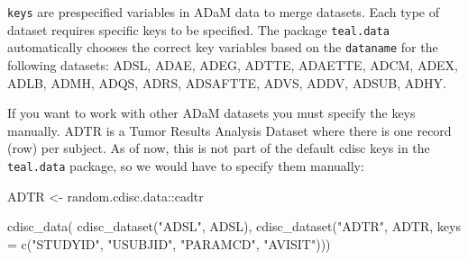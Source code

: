 \documentclass[
  letterpaper,
  DIV=11,
  numbers=noendperiod]{scrreprt}
\newenvironment{Shaded}{\begin{snugshade}}{\end{snugshade}}
\newcommand{\AttributeTok}[1]{\textcolor[rgb]{0.40,0.45,0.13}{#1}}
\newcommand{\FunctionTok}[1]{\textcolor[rgb]{0.28,0.35,0.67}{#1}}
\newcommand{\NormalTok}[1]{\textcolor[rgb]{0.00,0.23,0.31}{#1}}
\newcommand{\OtherTok}[1]{\textcolor[rgb]{0.00,0.23,0.31}{#1}}
\newcommand{\SpecialCharTok}[1]{\textcolor[rgb]{0.37,0.37,0.37}{#1}}
\newcommand{\StringTok}[1]{\textcolor[rgb]{0.13,0.47,0.30}{#1}}
\begin{document}
\begin{tcolorbox}[enhanced jigsaw, leftrule=.75mm, arc=.35mm, colback=white, colframe=quarto-callout-note-color-frame, opacityback=0, toprule=.15mm, bottomrule=.15mm, rightrule=.15mm, left=2mm, breakable]
\begin{minipage}[t]{5.5mm}
\textcolor{quarto-callout-note-color}{\faInfo}
\end{minipage}%
\begin{minipage}[t]{\textwidth - 5.5mm}
\texttt{keys} are prespecified variables in ADaM data to merge datasets.
Each type of dataset requires specific keys to be specified. The package
\texttt{teal.data} automatically chooses the correct key variables based
on the \texttt{dataname} for the following datasets: ADSL, ADAE, ADEG,
ADTTE, ADAETTE, ADCM, ADEX, ADLB, ADMH, ADQS, ADRS, ADSAFTTE, ADVS,
ADDV, ADSUB, ADHY.

If you want to work with other ADaM datasets you must specify the keys
manually. ADTR is a Tumor Results Analysis Dataset where there is one
record (row) per subject. As of now, this is not part of the default
cdisc keys in the \texttt{teal.data} package, so we would have to
specify them manually:

\begin{Shaded}
\begin{Highlighting}[]
\NormalTok{ADTR }\OtherTok{\textless{}{-}}\NormalTok{ random.cdisc.data}\SpecialCharTok{::}\NormalTok{cadtr}


\FunctionTok{cdisc\_data}\NormalTok{(}
  \FunctionTok{cdisc\_dataset}\NormalTok{(}\StringTok{"ADSL"}\NormalTok{, ADSL),}
  \FunctionTok{cdisc\_dataset}\NormalTok{(}\StringTok{"ADTR"}\NormalTok{, ADTR, }\AttributeTok{keys =} \FunctionTok{c}\NormalTok{(}\StringTok{"STUDYID"}\NormalTok{, }\StringTok{"USUBJID"}\NormalTok{, }\StringTok{"PARAMCD"}\NormalTok{, }\StringTok{"AVISIT"}\NormalTok{)))}
\end{Highlighting}
\end{Shaded}


\end{minipage}
\end{tcolorbox}
\end{document}
